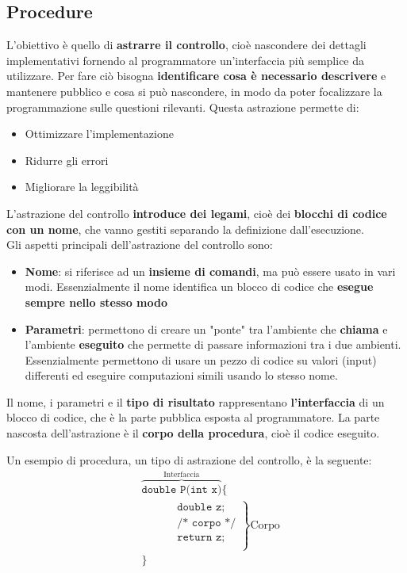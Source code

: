 \documentclass[a4paper]{article}
\begin{document}
\subsection{Procedure}
L'obiettivo è quello di \textbf{astrarre il controllo}, cioè nascondere dei
dettagli implementativi fornendo al programmatore un'interfaccia più semplice da
utilizzare.
Per fare ciò bisogna \textbf{identificare cosa è necessario descrivere} e mantenere
pubblico e cosa si può nascondere, in modo da poter focalizzare la programmazione
sulle questioni rilevanti. Questa astrazione permette di:
\begin{itemize}
  \item Ottimizzare l'implementazione
  \item Ridurre gli errori
  \item Migliorare la leggibilità
\end{itemize}
L'astrazione del controllo \textbf{introduce dei legami}, cioè dei \textbf{blocchi di
codice con un nome}, che vanno gestiti separando la definizione dall'esecuzione. \\
Gli aspetti principali dell'astrazione del controllo sono:
\begin{itemize}
  \item \textbf{Nome}: si riferisce ad un \textbf{insieme di comandi}, ma può essere
    usato in vari modi. Essenzialmente il nome identifica un blocco di codice
    che \textbf{esegue sempre nello stesso modo}

  \item \textbf{Parametri}: permettono di creare un "ponte" tra l'ambiente che
    \textbf{chiama} e l'ambiente \textbf{eseguito} che permette di passare informazioni
    tra i due ambienti. Essenzialmente permettono di usare un pezzo di codice su
    valori (input) differenti ed eseguire computazioni simili usando lo stesso nome.
\end{itemize}
Il nome, i parametri e il \textbf{tipo di risultato} rappresentano
\textbf{l'interfaccia} di un blocco di codice, che è la parte pubblica esposta al
programmatore. La parte nascosta dell'astrazione è il \textbf{corpo della procedura},
cioè il codice eseguito.

\begin{Example}{}{}
  Un esempio di procedura, un tipo di astrazione del controllo, è la seguente:
  \[
    \begin{aligned}
      &\overbrace{\texttt{double P(int x)}}^{\text{Interfaccia}} \texttt{\{}\\
      &\quad\left.
      \begin{aligned}
        &\quad \texttt{double z;}\\
        &\quad \texttt{/* corpo */}\\
        &\quad \texttt{return z;}\\
      \end{aligned}
      \right\} \text{Corpo} \\
      &\texttt{\}}
    \end{aligned}
  \] 
\end{Example}
\end{document}
